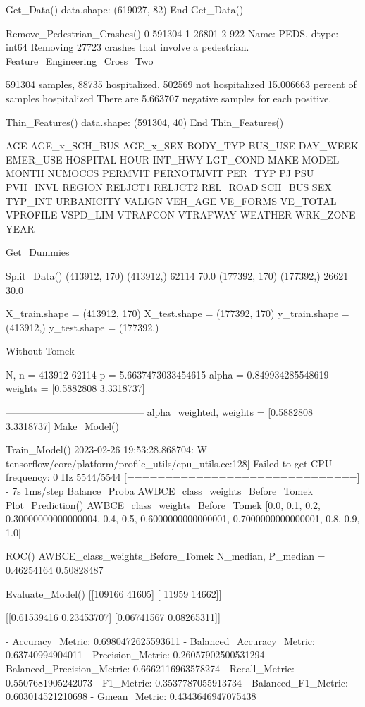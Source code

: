 Get_Data()
data.shape:  (619027, 82)
End Get_Data()

Remove_Pedestrian_Crashes()
0    591304
1     26801
2       922
Name: PEDS, dtype: int64
Removing 27723 crashes that involve a pedestrian.
Feature_Engineering_Cross_Two

591304 samples, 88735 hospitalized, 502569 not hospitalized
15.006663 percent of samples hospitalized
There are 5.663707 negative samples for each positive.

Thin_Features()
data.shape:  (591304, 40)
End Thin_Features()

AGE
AGE_x_SCH_BUS
AGE_x_SEX
BODY_TYP
BUS_USE
DAY_WEEK
EMER_USE
HOSPITAL
HOUR
INT_HWY
LGT_COND
MAKE
MODEL
MONTH
NUMOCCS
PERMVIT
PERNOTMVIT
PER_TYP
PJ
PSU
PVH_INVL
REGION
RELJCT1
RELJCT2
REL_ROAD
SCH_BUS
SEX
TYP_INT
URBANICITY
VALIGN
VEH_AGE
VE_FORMS
VE_TOTAL
VPROFILE
VSPD_LIM
VTRAFCON
VTRAFWAY
WEATHER
WRK_ZONE
YEAR

Get_Dummies

Split_Data()
(413912, 170) (413912,) 62114 70.0 %
(177392, 170) (177392,) 26621 30.0 %

X_train.shape =  (413912, 170)
X_test.shape =  (177392, 170)
y_train.shape =  (413912,)
y_test.shape =  (177392,)

Without Tomek

N, n =  413912 62114
p =  5.6637473033454615
alpha =  0.849934285548619
weights =  [0.5882808 3.3318737]


------------------------------------------
alpha_weighted, weights =  [0.5882808 3.3318737]
Make_Model()

Train_Model()
2023-02-26 19:53:28.868704: W tensorflow/core/platform/profile_utils/cpu_utils.cc:128] Failed to get CPU frequency: 0 Hz
5544/5544 [==============================] - 7s 1ms/step
Balance_Proba
AWBCE_class_weights_Before_Tomek
Plot_Prediction()
AWBCE_class_weights_Before_Tomek
[0.0, 0.1, 0.2, 0.30000000000000004, 0.4, 0.5, 0.6000000000000001, 0.7000000000000001, 0.8, 0.9, 1.0]


ROC()
AWBCE_class_weights_Before_Tomek
N_median, P_median =  0.46254164 0.50828487


Evaluate_Model()
[[109166  41605]
 [ 11959  14662]]

[[0.61539416 0.23453707]
 [0.06741567 0.08265311]]

- Accuracy_Metric:  0.6980472625593611
- Balanced_Accuracy_Metric:  0.63740994904011
- Precision_Metric:  0.26057902500531294
- Balanced_Precision_Metric:  0.6662116963578274
- Recall_Metric:  0.5507681905242073
- F1_Metric:  0.3537787055913734
- Balanced_F1_Metric:  0.603014521210698
- Gmean_Metric:  0.4343646947075438

